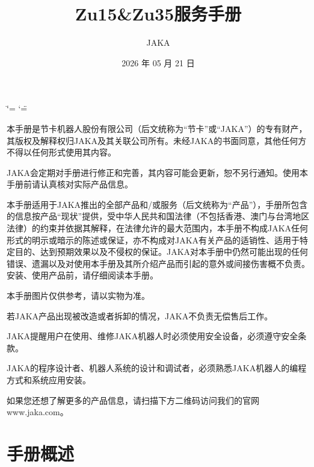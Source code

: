 \documentclass[a4paper,11pt,english,openany,oneside]{sphinxmanual}
\title{Zu15&Zu35服务手册}
\date{2026 年 05 月 21 日}
\author{JAKA}
\let\origsphinxtableofcontents\sphinxtableofcontents
\renewcommand{\sphinxtableofcontents}{
    \begingroup
    \cleardoublepage
    \pagenumbering{Roman}
    \pagestyle{plain} 
    \hypersetup{linkcolor=black}
    \origsphinxtableofcontents
    \clearpage
    \endgroup
    \pagenumbering{arabic}
    \pagestyle{normal}
}
\begin{document}
\ifdefined\shorthandoff
  \ifnum\catcode`\=\string=\active\shorthandoff{=}\fi
  \ifnum\catcode`\"=\active{}\fi
\fi

\pagestyle{empty}

\pagestyle{plain}
\sphinxtableofcontents
\pagestyle{normal}
\label{\detokenize{index::doc}}


\sphinxAtStartPar
本手册是节卡机器人股份有限公司（后文统称为“节卡”或“JAKA”）的专有财产，其版权及解释权归JAKA及其关联公司所有。未经JAKA的书面同意，其他任何方不得以任何形式使用其内容。

\sphinxAtStartPar
JAKA会定期对手册进行修正和完善，其内容可能会更新，恕不另行通知。使用本手册前请认真核对实际产品信息。

\sphinxAtStartPar
本手册适用于JAKA推出的全部产品和/或服务（后文统称为“产品”），手册所包含的信息按产品“现状”提供，受中华人民共和国法律（不包括香港、澳门与台湾地区法律）的约束并依据其解释，在法律允许的最大范围内，本手册不构成JAKA任何形式的明示或暗示的陈述或保证，亦不构成对JAKA有关产品的适销性、适用于特定目的、达到预期效果以及不侵权的保证。JAKA对本手册中仍然可能出现的任何错误、遗漏以及对使用本手册及其所介绍产品而引起的意外或间接伤害概不负责。安装、使用产品前，请仔细阅读本手册。

\sphinxAtStartPar
本手册图片仅供参考，请以实物为准。

\sphinxAtStartPar
若JAKA产品出现被改造或者拆卸的情况，JAKA不负责无偿售后工作。

\sphinxAtStartPar
JAKA提醒用户在使用、维修JAKA机器人时必须使用安全设备，必须遵守安全条款。

\sphinxAtStartPar
JAKA的程序设计者、机器人系统的设计和调试者，必须熟悉JAKA机器人的编程方式和系统应用安装。

\sphinxAtStartPar
{}

\sphinxAtStartPar
如果您还想了解更多的产品信息，请扫描下方二维码访问我们的官网www.jaka.com。

\begin{figure}[H]
\centering

\noindent{}
\end{figure}

\sphinxstepscope


\chapter{手册概述}
\label{\detokenize{_u624b_u518c_u6982_u8ff0:id1}}\label{\detokenize{_u624b_u518c_u6982_u8ff0::doc}}
\end{document}
